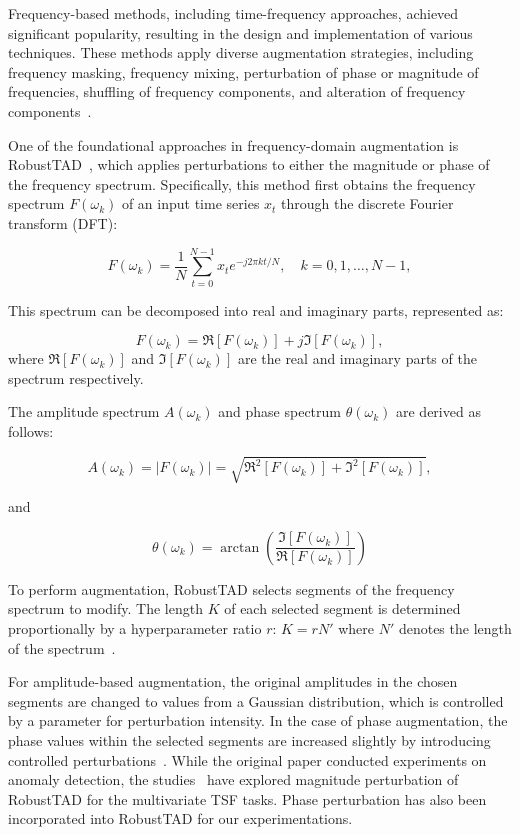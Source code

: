 Frequency-based methods, including time-frequency approaches, achieved significant popularity, resulting in the design and implementation of various techniques. These methods apply diverse augmentation strategies, including frequency masking, frequency mixing, perturbation of phase or magnitude of frequencies, shuffling of frequency components, and alteration of frequency components~\cite{chen2023fraugfrequencydomainaugmentation, zhao2024dominantshufflesimplepowerful, gao2021robusttadrobusttimeseries, freqpool, freqadd, arabi2024wavemaskmixexploringwaveletbasedaugmentations}. 


One of the foundational approaches in frequency-domain augmentation is RobustTAD~\cite{gao2021robusttadrobusttimeseries}, which applies perturbations to either the magnitude or phase of the frequency spectrum. Specifically, this method first obtains the frequency spectrum $F(\omega_k)$ of an input time series $x_t$ through the discrete Fourier transform (DFT):

\[ F(\omega_k) = \frac{1}{N}\sum_{t=0}^{N-1} x_t e^{-j2\pi kt/N}, \quad k=0,1,\dots,N-1,  \]


This spectrum can be decomposed into real and imaginary parts, represented as:

\[ F(\omega_k) = \Re[F(\omega_k)] + j\Im[F(\omega_k)], \]
where $\Re[F(\omega_k)]$ and $\Im[F(\omega_k)]$ are the real and imaginary parts of the spectrum respectively.

The amplitude spectrum $A(\omega_k)$ and phase spectrum $\theta(\omega_k)$  are derived as follows:

\[  A(\omega_k) = |F(\omega_k)| = \sqrt{\Re^2[F(\omega_k)] + \Im^2[F(\omega_k)]},  \]

and

\[ \theta(\omega_k) = \arctan\left(\frac{\Im[F(\omega_k)]}{\Re[F(\omega_k)]}\right) \]



To perform augmentation, RobustTAD selects segments of the frequency spectrum to modify. The length $K$ of each selected segment is determined proportionally by a hyperparameter ratio $r$: $K = r N'$ where $N'$ denotes the length of the spectrum~\cite{gao2021robusttadrobusttimeseries}.

For amplitude-based augmentation, the original amplitudes in the chosen segments are changed to values from a Gaussian distribution, which is controlled by a parameter for perturbation intensity. In the case of phase augmentation, the phase values within the selected segments are increased slightly by introducing controlled perturbations~\cite{gao2021robusttadrobusttimeseries}. While the original paper conducted experiments on anomaly detection, the studies~\cite{chen2023fraugfrequencydomainaugmentation, zhang2023diversecoherentaugmentationtimeseries, zhao2024dominantshufflesimplepowerful} have explored magnitude perturbation of RobustTAD for the multivariate TSF tasks. Phase perturbation has also been incorporated into RobustTAD for our experimentations.





